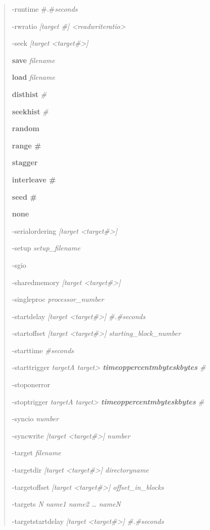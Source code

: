\begin{quote}
-runtime \#.\#\emph{seconds}

-rwratio \emph{{[}target \#{]} \textless readwriteratio\textgreater{}}

-seek \emph{{[}target \textless target\#\textgreater{]}}

\textbf{save} \emph{filename}

\textbf{load} \emph{filename}

\textbf{disthist} \emph{\#}

\textbf{seekhist} \emph{\#}

\textbf{random}

\textbf{range \#}

\textbf{stagger}

\textbf{interleave \#}

\textbf{seed \#}

\textbf{none}

-serialordering \emph{{[}target \textless target\#\textgreater{]}}

-setup \emph{setup\_filename}

-sgio

-sharedmemory \emph{{[}target \textless target\#\textgreater{]}}

-singleproc \emph{processor\_number}

-startdelay \emph{{[}target \textless target\#\textgreater{]} \#.\#seconds}

-startoffset \emph{{[}target \textless target\#\textgreater{]} starting\_block\_number}

-starttime \emph{\#seconds}

-starttrigger \emph{targetA target\textgreater{} \textbf{time\textbar op\textbar percent\textbar mbytes\textbar kbytes} \#}

-stoponerror

-stoptrigger \emph{targetA target\textgreater{} \textbf{time\textbar op\textbar percent\textbar mbytes\textbar kbytes} \#}

-syncio \emph{number}

-syncwrite \emph{{[}target \textless target\#\textgreater{]} number}

-target \emph{filename}

-targetdir \emph{{[}target \textless target\#\textgreater{]} directoryname}

-targetoffset \emph{{[}target \textless target\#\textgreater{]} offset\_in\_blocks}

-targets \emph{N name1 name2 \ldots{} nameN}

-targetstartdelay \emph{{[}target \textless target\#\textgreater{]} \#.\#seconds}


\end{quote}
